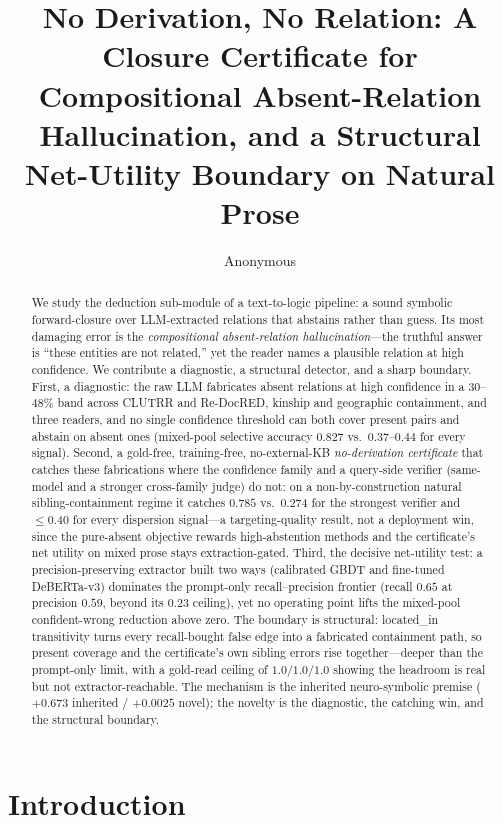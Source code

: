 \documentclass[11pt,letterpaper]{article}
\title{No Derivation, No Relation: A Closure Certificate for Compositional Absent-Relation Hallucination, and a Structural Net-Utility Boundary on Natural Prose}
\author{Anonymous}
\date{}
\begin{document}
\maketitle

\begin{abstract}
We study the deduction sub-module of a text-to-logic pipeline: a sound symbolic forward-closure over LLM-extracted relations that abstains rather than guess. Its most damaging error is the \emph{compositional absent-relation hallucination}---the truthful answer is ``these entities are not related,'' yet the reader names a plausible relation at high confidence. We contribute a diagnostic, a structural detector, and a sharp boundary. First, a diagnostic: the raw LLM fabricates absent relations at high confidence in a $30$--$48\%$ band across CLUTRR and Re-DocRED, kinship and geographic containment, and three readers, and no single confidence threshold can both cover present pairs and abstain on absent ones (mixed-pool selective accuracy $0.827$ vs.\ $0.37$--$0.44$ for every signal). Second, a gold-free, training-free, no-external-KB \emph{no-derivation certificate} that catches these fabrications where the confidence family and a query-side verifier (same-model and a stronger cross-family judge) do not: on a non-by-construction natural sibling-containment regime it catches $0.785$ vs.\ $0.274$ for the strongest verifier and $\leq 0.40$ for every dispersion signal---a targeting-quality result, not a deployment win, since the pure-absent objective rewards high-abstention methods and the certificate's net utility on mixed prose stays extraction-gated. Third, the decisive net-utility test: a precision-preserving extractor built two ways (calibrated GBDT and fine-tuned DeBERTa-v3) dominates the prompt-only recall--precision frontier (recall $0.65$ at precision $0.59$, beyond its $0.23$ ceiling), yet no operating point lifts the mixed-pool confident-wrong reduction above zero. The boundary is structural: \textsf{located\_in} transitivity turns every recall-bought false edge into a fabricated containment path, so present coverage and the certificate's own sibling errors rise together---deeper than the prompt-only limit, with a gold-read ceiling of $1.0/1.0/1.0$ showing the headroom is real but not extractor-reachable. The mechanism is the inherited neuro-symbolic premise ($+0.673$ inherited / $+0.0025$ novel); the novelty is the diagnostic, the catching win, and the structural boundary.
\end{abstract}

\section{Introduction}
\label{sec:intro}
\end{document}
